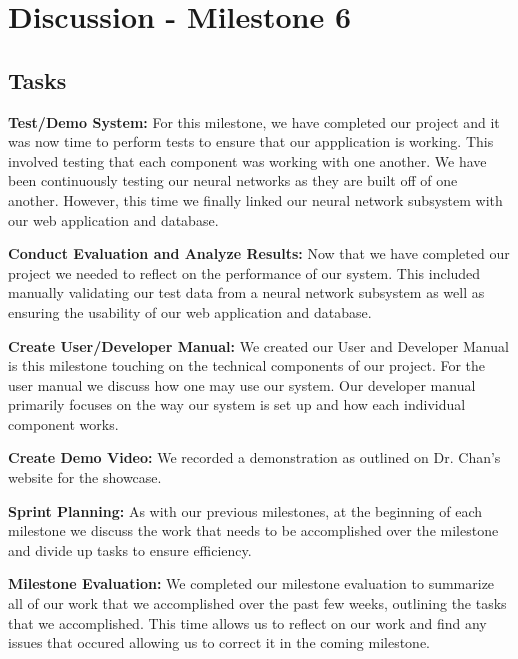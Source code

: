 \documentclass[12pt]{article}
\begin{document}
\section{Discussion - Milestone 6}

\subsection{Tasks}

\noindent\textbf{Test/Demo System:} For this milestone, we have completed our project and it was now time to 
perform tests to ensure that our appplication is working. This involved testing that each component was working with
one another. We have been continuously testing our neural networks as they are built off of one another. However, this
time we finally linked our neural network subsystem with our web application and database.

\medskip

\noindent\textbf{Conduct Evaluation and Analyze Results:} Now that we have completed our project we needed to reflect
on the performance of our system. This included manually validating our test data from a neural network subsystem as
well as ensuring the usability of our web application and database.

\medskip

\noindent\textbf{Create User/Developer Manual:} We created our User and Developer Manual is this milestone touching
on the technical components of our project. For the user manual we discuss how one may use our system. Our developer manual
primarily focuses on the way our system is set up and how each individual component works.

\medskip

\noindent\textbf{Create Demo Video:}  We recorded a demonstration as outlined
on Dr. Chan's website for the showcase.


\medskip

\noindent\textbf{Sprint Planning:} As with our previous milestones, at the beginning of each milestone we discuss the work that needs to be accomplished
over the milestone and divide up tasks to ensure efficiency.

\medskip

\noindent\textbf{Milestone Evaluation:} We completed our milestone evaluation to summarize all of our work that we accomplished over the past few weeks,
outlining the tasks that we accomplished. This time allows us to reflect on our work and find any issues that occured allowing us to correct it in the coming
milestone.
\end{document}
